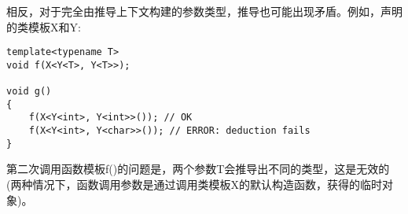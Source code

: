 相反，对于完全由推导上下文构建的参数类型，推导也可能出现矛盾。例如，声明的类模板X和Y:

\begin{lstlisting}[style=styleCXX]
template<typename T>
void f(X<Y<T>, Y<T>>);

void g()
{
	f(X<Y<int>, Y<int>>()); // OK
	f(X<Y<int>, Y<char>>()); // ERROR: deduction fails
}
\end{lstlisting}

第二次调用函数模板f()的问题是，两个参数T会推导出不同的类型，这是无效的(两种情况下，函数调用参数是通过调用类模板X的默认构造函数，获得的临时对象)。
































